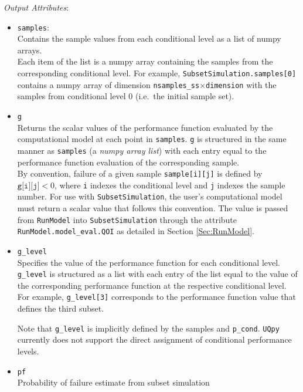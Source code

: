 \noindent\textit{Output Attributes}:
\begin{itemize}
\item \texttt{samples}:\\
	Contains the sample values from each conditional level as a list of numpy arrays.\\
    
    Each item of the list is a numpy array containing the samples from the corresponding conditional level. For example, \texttt{SubsetSimulation.samples[0]} contains a numpy array of dimension \texttt{nsamples\_ss}$\times$\texttt{dimension} with the samples from conditional level 0 (i.e.\ the initial sample set).
\item \texttt{g}\\
	Returns the scalar values of the performance function evaluated by the computational model at each point in \texttt{samples}. \texttt{g} is structured in the same manner as \texttt{samples} (a {\it numpy array list}) with each entry equal to the performance function evaluation of the corresponding sample.\\
    
    By convention, failure of a given sample \texttt{sample[i][j]} is defined by $\texttt{g[i][j]}<0$, where \texttt{i} indexes the conditional level and \texttt{j} indexes the sample number. For use with \texttt{SubsetSimulation}, the user's computational model must return a scalar value that follows this convention. The value is passed from \texttt{RunModel} into \texttt{SubsetSimulation} through the attribute \texttt{RunModel.model\_eval.QOI} as detailed in Section \ref{Sec:RunModel}.
\item \texttt{g\_level}\\
	Specifies the value of the performance function for each conditional level. \texttt{g\_level} is structured as a list with each entry of the list equal to the value of the corresponding performance function at the respective conditional level. For example, \texttt{g\_level[3]} corresponds to the performance function value that defines the third subset.
    
    Note that \texttt{g\_level} is implicitly defined by the samples and \texttt{p\_cond}. \texttt{UQpy} currently does not support the direct assignment of conditional performance levels.
\item \texttt{pf}\\
	Probability of failure estimate from subset simulation
\end{itemize}

